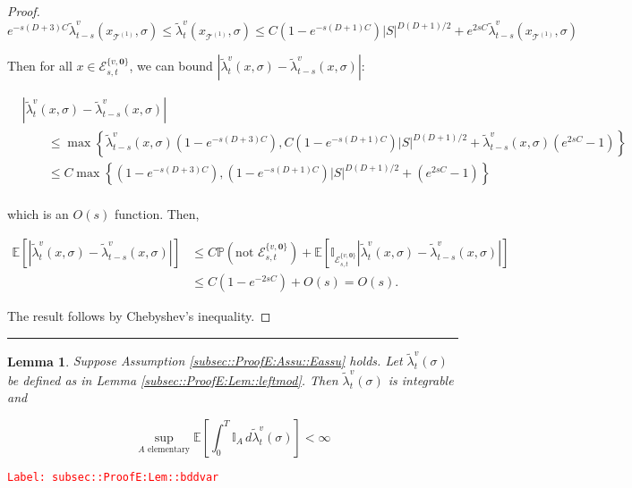 \documentclass[12pt]{article}
\newcommand{\mb}{\mathbb}
\newcommand{\mc}{\mathcal}
\newcommand{\te}{\text}
\newcommand{\tr}{\textcolor{red}}
\newcommand{\labe}[1]{\tr{\texttt{Label: #1}}}
\newcommand{\lin}{\rule{\linewidth}{0.4 pt}}
\newcommand{\pr}{\mb{P}}							%
\newcommand{\ex}[1]{\mb{E}\left[#1\right]}			%
\renewcommand{\root}{\mathbf{0}}				%
\renewcommand{\v}{v}							%
\renewcommand{\S}{S}							%
\newcommand{\s}{\sigma}							%
\newcommand{\T}{T}								%
\newcommand{\x}{x}								%
\renewcommand{\t}{t}							%
\renewcommand{\tt}{s}							%
\newcommand{\vind}[1]{^{#1}}					%
\newcommand{\cind}[1]{_{#1}}					%
\newcommand{\ts}[1]{_{#1}}						%
\newcommand{\const}{C}							%
\newcommand{\degr}{D}							%
\newcommand{\tree}{\mc{T}}						%
\newcommand{\sln}[1]{^{(#1)}}					%
\newcommand{\alt}[1]{\widetilde{#1}}			%
\newcommand{\evnt}{\mc{E}}						%
\newcommand{\typset}{A}							%
\newcommand{\crate}{\alt{\lambda}}				%
\newtheorem{lem}[thms]{Lemma}
\begin{document}
\begin{proof}
\[e^{-\tt(\degr+3)\const}\crate\vind{\v}\ts{\t-\tt}(\x\cind{\tree\sln{1}},\s) \leq \crate\vind{\v}\ts{\t}(\x\cind{\tree\sln{1}},\s) \leq \const(1 - e^{-\tt(\degr+1)\const})|\S|^{\degr(\degr+1)/2} + e^{2\tt\const}\crate\vind{\v}\ts{\t-\tt}(\x\cind{\tree\sln{1}},\s)\]

Then for all \(\x \in \evnt^{\{\v,\root\}}_{\tt,\t}\), we can bound \(|\crate\vind{\v}\ts{\t}(\x,\s) - \crate\vind{\v}\ts{\t-\tt}(\x,\s)|\):

\begin{align*}
&|\crate\vind{\v}\ts{\t}(\x,\s) - \crate\vind{\v}\ts{\t-\tt}(\x,\s)| \\
&\hspace{24pt}\leq \max\left\{\crate\vind{\v}\ts{\t-\tt}(\x,\s)\left(1 - e^{-\tt(\degr+3)\const}\right),\const(1-e^{-\tt(\degr+1)\const})|\S|^{\degr(\degr+1)/2} + \crate\vind{\v}\ts{\t-\tt}(\x,\s)\left(e^{2\tt\const} - 1\right)\right\}\\
&\hspace{24pt}\leq \const\max\left\{\left(1 - e^{-\tt(\degr+3)\const}\right),(1-e^{-\tt(\degr+1)\const})|\S|^{\degr(\degr+1)/2} + \left(e^{2\tt\const} - 1\right)\right\}\\
\end{align*}

which is an \(O(\tt)\) function. Then,

\begin{align*}
\ex{|\crate\vind{\v}\ts{\t}(\x,\s) - \crate\vind{\v}\ts{\t-\tt}(\x,\s)|} &\leq \const\pr\left(\te{not }\evnt^{\{\v,\root\}}_{\tt,\t}\right) + \ex{\mb{I}_{\evnt^{\{\v,\root\}}_{\tt,\t}}|\crate\vind{\v}\ts{\t}(\x,\s) - \crate\vind{\v}\ts{\t-\tt}(\x,\s)|}\\
&\leq \const(1 - e^{-2\tt\const}) + O(\tt) = O(\tt).
\end{align*}

The result follows by Chebyshev's inequality.
\end{proof}

\lin

\begin{lem}
Suppose Assumption \ref{subsec::ProofE:Assu::Eassu} holds. Let \(\crate\vind{\v}\ts{\t}(\s)\) be defined as in Lemma \ref{subsec::ProofE:Lem::leftmod}. Then \(\crate\vind{\v}\ts{\t}(\s)\) is integrable and 

\[\sup_{\typset\te{ elementary}} \ex{\int_0^\T \mb{I}_\typset\,d\crate\vind{\v}\ts{\t}(\s)} < \infty\]
\label{subsec::ProofE:Lem::bddvar}
\end{lem}
\labe{subsec::ProofE:Lem::bddvar}
\end{document}
